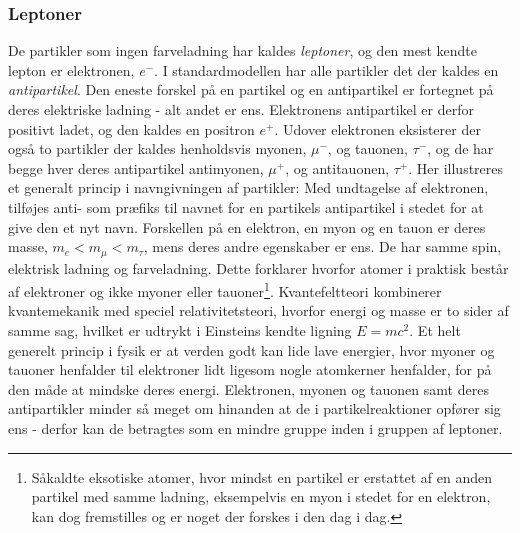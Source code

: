 \subsubsection{Leptoner} \label{sec:lepton}
De partikler som ingen farveladning har kaldes \emph{leptoner}, og den mest kendte lepton er elektronen, $e^-$. I standardmodellen har alle partikler det der kaldes en \emph{antipartikel}. Den eneste forskel på en partikel og en antipartikel er fortegnet på deres elektriske ladning - alt andet er ens. Elektronens antipartikel er derfor positivt ladet, og den kaldes en positron $e^+$. Udover elektronen eksisterer der også to partikler der kaldes henholdsvis myonen, $\mu^-$, og tauonen, $\tau^-$, og de har begge hver deres antipartikel antimyonen, $\mu^+$, og antitauonen, $\tau^+$. Her illustreres et generalt princip i navngivningen af partikler: Med undtagelse af elektronen,  tilføjes anti- som præfiks til navnet for en partikels antipartikel i stedet for at give den et nyt navn. Forskellen på en elektron, en myon og en tauon er deres masse, $m_e<m_\mu<m_\tau$, mens deres andre egenskaber er ens. De har samme spin, elektrisk ladning og farveladning. Dette forklarer hvorfor atomer i praktisk består af elektroner og ikke myoner eller tauoner\footnote{Såkaldte eksotiske atomer, hvor mindst en partikel er erstattet af en anden partikel med samme ladning, eksempelvis en myon i stedet for en elektron, kan dog fremstilles og er noget der forskes i den dag i dag.}. Kvantefeltteori kombinerer kvantemekanik med speciel relativitetsteori, hvorfor energi og masse er to sider af samme sag, hvilket er udtrykt i Einsteins kendte ligning $E = mc^2$. Et helt generelt princip i fysik er at verden godt kan lide lave energier, hvor myoner og tauoner henfalder til elektroner lidt ligesom nogle atomkerner henfalder, for på den måde at mindske deres energi. Elektronen, myonen og tauonen samt deres antipartikler minder så meget om hinanden at de i partikelreaktioner opfører sig ens - derfor kan de betragtes som en mindre gruppe inden i gruppen af leptoner. \\

